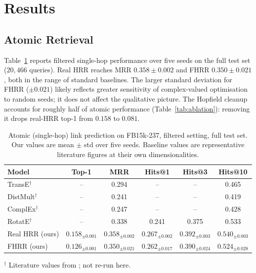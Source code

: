 \documentclass[11pt]{article}
\theoremstyle{definition}
\begin{document}
\section{Results}
\label{sec:results}

\subsection{Atomic Retrieval}
\label{sec:results-atomic}

Table~\ref{tab:atomic} reports filtered single-hop performance over five seeds
on the full test set ($20{,}466$ queries). Real HRR reaches MRR
$0.358 \pm 0.002$ and FHRR $0.350 \pm 0.021$, both in the range of standard
baselines. The larger standard deviation for FHRR ($\pm 0.021$) likely reflects
greater sensitivity of complex-valued optimisation to random seeds; it does not
affect the qualitative picture. The Hopfield cleanup accounts for roughly half
of atomic performance (Table~\ref{tab:ablation}): removing it drops real-HRR
top-1 from $0.158$ to $0.081$.

\begin{table}[H]
\centering
\caption{Atomic (single-hop) link prediction on FB15k-237, filtered setting,
full test set. Our values are mean $\pm$ std over five seeds. Baseline values
are representative literature figures at their own dimensionalities.}
\label{tab:atomic}
\begin{tabular}{lccccc}
\toprule
Model & Top-1 & MRR & Hits@1 & Hits@3 & Hits@10 \\
\midrule
TransE$^\dagger$    & --   & 0.294 & --     & --     & 0.465 \\
DistMult$^\dagger$  & --   & 0.241 & --     & --     & 0.419 \\
ComplEx$^\dagger$   & --   & 0.247 & --     & --     & 0.428 \\
RotatE$^\dagger$    & --   & 0.338 & 0.241  & 0.375  & 0.533 \\
\midrule
Real HRR (ours)     & $0.158_{\pm 0.001}$ & $0.358_{\pm 0.002}$
 & $0.267_{\pm 0.002}$ & $0.392_{\pm 0.003}$ & $0.540_{\pm 0.003}$ \\
FHRR (ours)         & $0.126_{\pm 0.001}$ & $0.350_{\pm 0.021}$
 & $0.262_{\pm 0.017}$ & $0.390_{\pm 0.024}$ & $0.524_{\pm 0.028}$ \\
\bottomrule
\end{tabular}
\vspace{2pt}
{\footnotesize $^\dagger$ Literature values from \cite{bordes2013transe,
yang2014distmult,trouillon2016complex,sun2019rotate}; not re-run here.}
\end{table}
\end{document}
